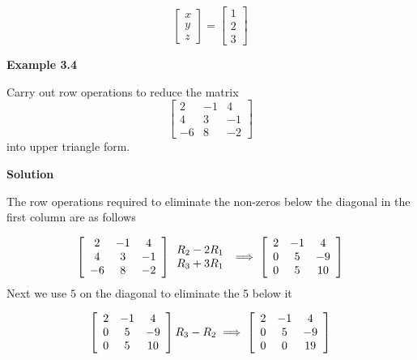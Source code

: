 \documentclass[a4paper, 12pt]{report}
\begin{document}
{     
     \begin{equation*}
     \begin{bmatrix} x\\y\\z \end{bmatrix}
     =
     \begin{bmatrix} 1\\2\\3 \end{bmatrix}
     \end{equation*}
     
     \begin{center}
     	\textbf{Example 3.4}
     \end{center}
      Carry out row operations to reduce the matrix   
     \begin{equation*}
     \begin{bmatrix} 2& -1& 4\\4& 3& -1\\-6& 8& -2 \end{bmatrix}
     \end{equation*}
     into upper triangle form.\\
     \begin{center}
     	\textbf{Solution}
     \end{center}
      The row operations required to eliminate the non-zeros below the diagonal in the first column are as follows 
     
     \[
     \left[ \begin{array}{c c c}
     2& -1& 4\\
     4& 3& -1\\
     -6& 8& -2
     \end{array} \right]
     \begin{array}{c}R_2-2R_1\\ R_3+3R_1 \end{array}
     \implies
     \left[ \begin{array}{c c c}
     2& -1& 4\\
     0& 5& -9\\
     0& 5& 10
     \end{array} \right]
     \]
     Next we use $\boxed{5}$ on the diagonal to eliminate the 5 below it
     
     \[
     \left[ \begin{array}{c c c}
     2& -1& 4\\
     0& 5& -9\\
     0& 5& 10
     \end{array} \right]
     R_3-R_2 \implies
     \left[ \begin{array}{c c c}
     2& -1& 4\\
     0& 5& -9\\
     0& 0& 19
     \end{array} \right]
     \]
     
}
\end{document}
